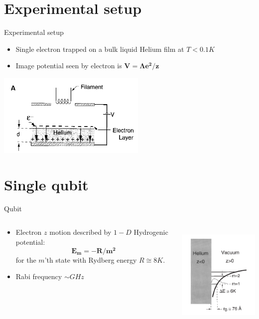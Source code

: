 \documentclass{beamer}
\begin{document}
\section{Experimental setup}
\begin{frame}[t]{Experimental setup}
    \begin{itemize}
        \item Single electron trapped on a bulk liquid Helium film at $T < 0.1 K$
        \item Image potential seen by electron is $\mathbf{V = \Lambda e^2/z}$
    \end{itemize}
    \centering\includegraphics[height=4cm]{images/setup.png}
\end{frame}

\section{Single qubit}
\begin{frame}{Qubit}
    \begin{columns}
        \begin{column}{0.48\textwidth}
            \begin{itemize}
                \item Electron $z$ motion described by $1-D$ Hydrogenic potential:
                    $$\mathbf{E_m = -R/m^2}$$
                for the $m$'th state with Rydberg energy $R\cong 8K$.
                \item Rabi frequency $\sim GHz$
            \end{itemize}
        \end{column}
        \begin{column}{0.48\textwidth}  %
            \includegraphics[height=5cm]{images/single qubit.png}
        \end{column}
    \end{columns}
\end{frame}
\end{document}
